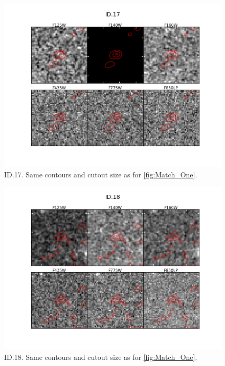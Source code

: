 \begin{figure}[tbp]
\centering \includegraphics[width=160mm]{Matched/ASPECS_Cutout_16.png}
\caption{ID.17. Same contours and cutout size as for \ref{fig:Match_One}.}
\label{fig:Match_Three}
\end{figure}

\begin{figure}[tbp]
\centering \includegraphics[width=160mm]{Matched/ASPECS_Cutout_17.png}
\caption{ID.18. Same contours and cutout size as for \ref{fig:Match_One}.}
\label{fig:Match_Three}
\end{figure}

